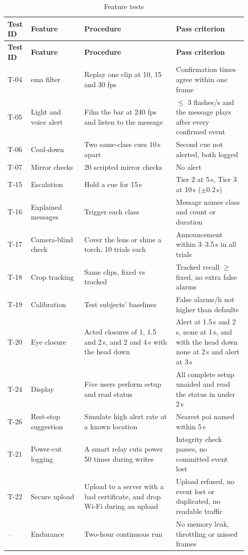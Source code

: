{\footnotesize
\setlength{\tabcolsep}{3pt}
\renewcommand{\arraystretch}{1.12}
\begin{longtable}{|p{0.075\linewidth}|p{0.210\linewidth}|p{0.360\linewidth}|p{0.290\linewidth}|}
\caption{Feature tests}
\label{tab:ch5-07}\\
\hline
\textbf{Test ID} & \textbf{Feature} & \textbf{Procedure} & \textbf{Pass criterion} \\
\hline
\endfirsthead
\hline
\textbf{Test ID} & \textbf{Feature} & \textbf{Procedure} & \textbf{Pass criterion} \\
\hline
\endhead
\hline
\endfoot
T-04 & \gls{ema} filter & Replay one clip at 10, 15 and 30 \gls{fps} & Confirmation times agree within one frame \\ \hline
T-05 & Light and voice alert & Film the bar at 240 \gls{fps} and listen to the message & $\le$ 3 flashes/s and the message plays after every confirmed event \\ \hline
T-06 & Cool-down & Two same-class cues 10\,s apart & Second cue not alerted, both logged \\ \hline
T-07 & Mirror checks & 20 scripted mirror checks & No alert \\ \hline
T-15 & Escalation & Hold a cue for 15\,s & Tier 2 at 5\,s, Tier 3 at 10\,s ($\pm$0.2\,s) \\ \hline
T-16 & Explained messages & Trigger each class & Message names class and count or duration \\ \hline
T-17 & Camera-blind check & Cover the lens or shine a torch, 10 trials each & Announcement within 3--3.5\,s in all trials \\ \hline
T-18 & Crop tracking & Same clips, fixed vs tracked & Tracked recall $\ge$ fixed, no extra false alarms \\ \hline
T-19 & Calibration & Test subjects' baselines & False alarms/h not higher than defaults \\ \hline
T-20 & Eye closure & Acted closures of 1, 1.5 and 2\,s, and 2 and 4\,s with the head down & Alert at 1.5\,s and 2\,s, none at 1\,s, and with the head down none at 2\,s and alert at 3\,s \\ \hline
T-24 & Display & Five users perform setup and read status & All complete setup unaided and read the status in under 2\,s \\ \hline
T-26 & Rest-stop suggestion & Simulate high alert rate at a known location & Nearest \gls{poi} named within 5\,s \\ \hline
T-21 & Power-cut logging & A smart relay cuts power 50 times during writes & Integrity check passes, no committed event lost \\ \hline
T-22 & Secure upload & Upload to a server with a bad certificate, and drop Wi-Fi during an upload & Upload refused, no event lost or duplicated, no readable traffic \\ \hline
-- & Endurance & Two-hour continuous run & No memory leak, throttling or missed frames \\ \hline
\end{longtable}
}



